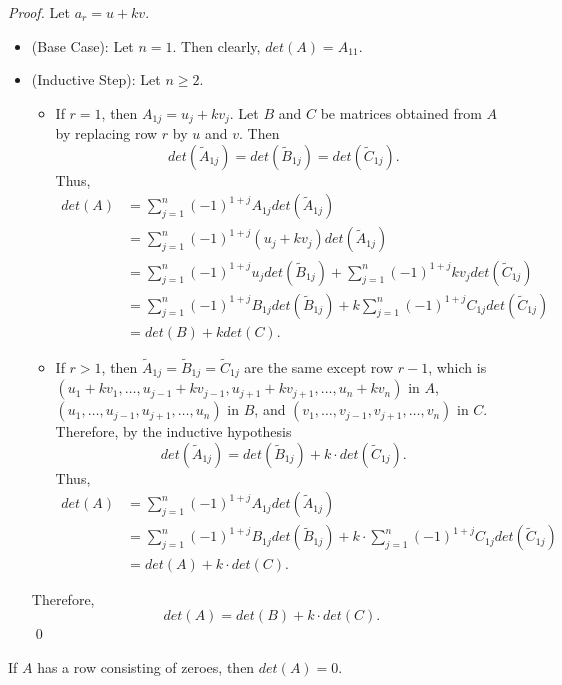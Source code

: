 \documentclass[12pt]{article}
\newenvironment{corollary}[2][Corollary]{\begin{trivlist}
\item[\hskip \labelsep {\bfseries #1}\hskip \labelsep {\bfseries #2}]}{\end{trivlist}}
\begin{document}
\textit{Proof.}
Let $a_r = u + kv$. \begin{itemize}
    \item[] (Base Case): Let $n = 1$. Then clearly, $det(A) = A_{11}$. 
    
    \item[] (Inductive Step): Let $n \geq 2$. \begin{itemize}
        \item If $r = 1$, then $A_{1j} = u_j + kv_j$. Let $B$ and $C$ be matrices obtained from $A$ by replacing row $r$ by $u$ and $v$. Then $$det(\tilde{A}_{1j}) = det(\tilde{B}_{1j}) = det(\tilde{C}_{1j}).$$ Thus, \begin{align*}
        det(A) &= \sum_{j = 1}^n(-1)^{1 + j}A_{1j}det(\tilde{A}_{1j}) \\
        &= \sum_{j = 1}^n(-1)^{1 + j}(u_j + kv_j)det(\tilde{A}_{1j}) \\
        &= \sum_{j = 1}^n(-1)^{1 + j}u_jdet(\tilde{B}_{1j}) + \sum_{j = 1}^n(-1)^{1 + j}kv_jdet(\tilde{C}_{1j}) \\
        &= \sum_{j = 1}^n(-1)^{1 + j}B_{1j}det(\tilde{B}_{1j}) + k\sum_{j = 1}^n(-1)^{1 + j}C_{1j}det(\tilde{C}_{1j}) \\ 
        &= det(B) + kdet(C).
    \end{align*}
    
    \item If $r > 1$, then $\tilde{A}_{1j} = \tilde{B}_{1j} = \tilde{C}_{1j}$ are the same except row $r - 1$, which is $(u_1 + kv_1, \dots, u_{j-1} + kv_{j - 1}, u_{j + 1} + kv_{j + 1}, \dots, u_n + kv_n)$ in $A$, $(u_1, \dots, u_{j-1}, u_{j + 1}, \dots, u_n)$ in $B$, and $(v_1, \dots, v_{j - 1}, v_{j + 1}, \dots, v_n)$ in $C$. Therefore, by the inductive hypothesis $$det(\tilde{A}_{1j}) = det(\tilde{B}_{1j}) + k \cdot det(\tilde{C}_{1j}).$$ Thus, \begin{align*}
        det(A) &= \sum_{j = 1}^n(-1)^{1+j}A_{1j}det(\tilde{A}_{1j}) \\
        &= \sum_{j = 1}^n(-1)^{1+j}B_{1j}det(\tilde{B}_{1j}) + k \cdot \sum_{j = 1}^n(-1)^{1+j}C_{1j}det(\tilde{C}_{1j}) \\ &= det(A) + k \cdot det(C).
    \end{align*}
    \end{itemize}
    Therefore, $$det(A) = det(B) + k \cdot det(C).$$\qed
\end{itemize}

\begin{corollary}{4}
If $A$ has a row consisting of zeroes, then $det(A) = 0$.
\end{corollary}
\end{document}
